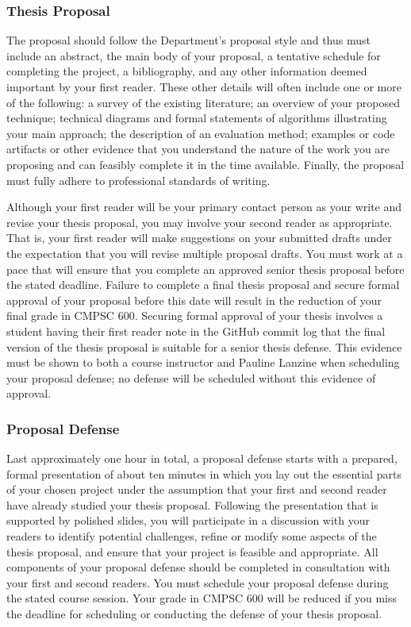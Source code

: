 \documentclass[11pt]{article}
\begin{document}
\subsubsection*{Thesis Proposal}

The proposal should follow the Department's proposal style and thus must include
an abstract, the main body of your proposal, a tentative schedule for completing
the project, a bibliography, and any other information deemed important by your
first reader. These other details will often include one or more of the
following: a survey of the existing literature; an overview of your proposed
technique; technical diagrams and formal statements of algorithms illustrating
your main approach; the description of an evaluation method; examples or code
artifacts or other evidence that you understand the nature of the work you are
proposing and can feasibly complete it in the time available.  Finally, the
proposal must fully adhere to professional standards of writing.

Although your first reader will be your primary contact person as your write and
revise your thesis proposal, you may involve your second reader as appropriate.
That is, your first reader will make suggestions on your submitted drafts under
the expectation that you will revise multiple proposal drafts. You must work at
a pace that will ensure that you complete an approved senior thesis proposal
before the stated deadline. Failure to complete a final thesis proposal and
secure formal approval of your proposal before this date will result in the
reduction of your final grade in CMPSC 600. Securing formal approval of your
thesis involves a student having their first reader note in the GitHub commit
log that the final version of the thesis proposal is suitable for a senior
thesis defense. This evidence must be shown to both a course instructor and
Pauline Lanzine when scheduling your proposal defense; no defense will be
scheduled without this evidence of approval.

\subsubsection*{Proposal Defense}

Last approximately one hour in total, a proposal defense starts with a prepared,
formal presentation of about ten minutes in which you lay out the essential
parts of your chosen project under the assumption that your first and second
reader have already studied your thesis proposal. Following the presentation
that is supported by polished slides, you will participate in a discussion with
your readers to identify potential challenges, refine or modify some aspects of
the thesis proposal, and ensure that your project is feasible and appropriate.
All components of your proposal defense should be completed in consultation with
your first and second readers. You must schedule your proposal defense during
the stated course session. Your grade in CMPSC 600 will be reduced if you miss
the deadline for scheduling or conducting the defense of your thesis proposal.
\end{document}
